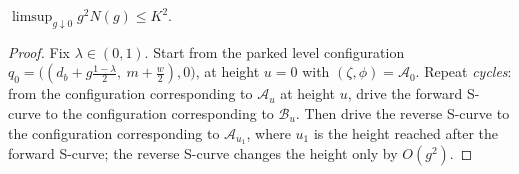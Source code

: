 \begin{proposition}\label{prop:asym-upper}
$\limsup_{g\downarrow0}g^2N(g)\le K^2$.
\end{proposition}

\begin{proof}
Fix $\lambda\in(0,1)$.
Start from the parked level configuration $q_0=\big((d_b+g\frac{1-\lambda}2,\ m+\frac w2),0\big)$, at height $u=0$ with $(\zeta,\phi)=\mathcal A_0$.
Repeat \emph{cycles}: from the configuration corresponding to $\mathcal A_u$ at height $u$, drive the forward S-curve to the configuration corresponding to $\mathcal B_u$.
Then drive the reverse S-curve to the configuration corresponding to $\mathcal A_{u_1}$, where $u_1$ is the height reached after the forward S-curve; the reverse S-curve changes the height only by $O(g^2)$.


\end{proof}
